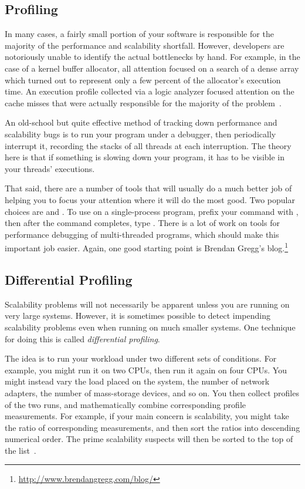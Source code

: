 \subsection{Profiling}
\label{sec:debugging:Profiling}

In many cases, a fairly small portion of your software is responsible
for the majority of the performance and scalability shortfall.
However, developers are notoriously unable to identify the actual
bottlenecks by hand.
For example, in the case of a kernel buffer allocator, all attention focused
on a search of a dense array which turned out to represent only
a few percent of the allocator's execution time.
An execution profile collected via a logic analyzer focused attention
on the cache misses that were actually responsible for the majority
of the problem~\cite{McKenney93}.

An old-school but quite effective method of tracking down performance
and scalability bugs is to run your program under a debugger,
then periodically interrupt it, recording the stacks of all threads
at each interruption.
The theory here is that if something is slowing down your program,
it has to be visible in your threads' executions.

That said, there are a number of tools
that will usually do a much better job of helping you to focus your
attention where it will do the most good.
Two popular choices are  and .
To use  on a single-process program, prefix your command
with , then after the command completes, type
.
There is a lot of work on tools for performance debugging of multi-threaded
programs, which should make this important job easier.
Again, one good starting point is Brendan Gregg's blog.\footnote{
	\url{http://www.brendangregg.com/blog/}}

\subsection{Differential Profiling}
\label{sec:debugging:Differential Profiling}

Scalability problems will not necessarily be apparent unless you are running
on very large systems.
However, it is sometimes possible to detect impending scalability problems
even when running on much smaller systems.
One technique for doing this is called \emph{differential profiling}.

The idea is to run your workload under two different sets of conditions.
For example, you might run it on two CPUs, then run it again on four
CPUs.
You might instead vary the load placed on the system, the number of
network adapters, the number of mass-storage devices, and so on.
You then collect profiles of the two runs, and mathematically combine
corresponding profile measurements.
For example, if your main concern is scalability, you might take the
ratio of corresponding measurements, and then sort the ratios into
descending numerical order.
The prime scalability suspects will then be sorted to the top of the
list~\cite{McKenney95a,McKenney99b}.

